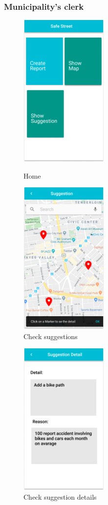 \documentclass{article}
\begin{document}
\subsubsection{Municipality's clerk}
\begin{figure}[!htb]
	\centering
	\begin{minipage}{.45\textwidth}
		\centering
		\includegraphics[height=7.7cm,keepaspectratio]{images/mockups/Home_Municipality.png}
		\caption{Home}
	\end{minipage}\quad
	\begin{minipage}{.45\textwidth} 
		\centering
		\includegraphics[height=7.7cm,keepaspectratio]{images/mockups/Suggestions.png}
		\caption{Check suggestions}
	\end{minipage}
\end{figure}

\begin{figure}[!htb]
		\centering
		\includegraphics[height=7.7cm,keepaspectratio]{images/mockups/Suggestions_Detail.png}
		\caption{Check suggestion details}
\end{figure}
\end{document}
